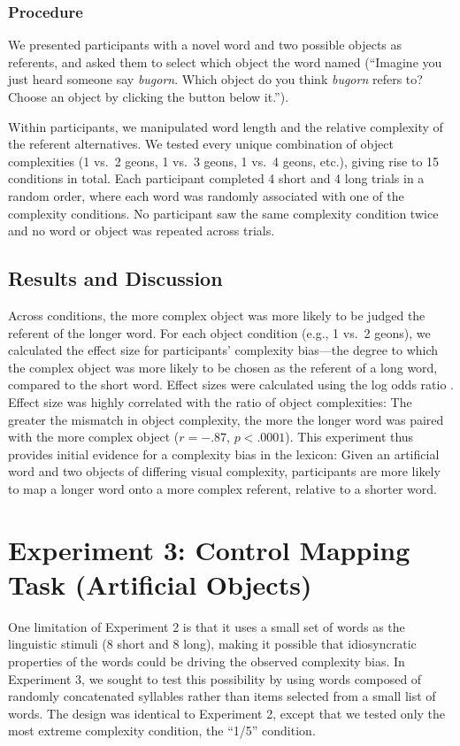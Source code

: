 \subsubsection{Procedure}

We presented participants with a novel word and two possible objects as referents, and asked them to select which object the word named (``Imagine you just heard someone say {\it bugorn}. Which object do you think {\it bugorn} refers to? Choose an object by clicking the button below it.'').

Within participants, we manipulated word length and the relative complexity of the referent alternatives. We tested every unique combination of object complexities (1 vs.\ 2 geons, 1 vs.\ 3 geons, 1 vs.\ 4 geons, etc.), giving rise to 15 conditions in total. Each participant completed 4 short and 4 long trials in a random order, where each word was randomly associated with one of the complexity conditions. No participant saw the same complexity condition twice and no word or object was repeated across trials.

\subsection{Results and Discussion}
Across conditions, the more complex object was more likely to be judged the referent of the longer word. For each object condition (e.g., 1 vs.\ 2 geons), we calculated the effect size for participants' complexity bias---the degree to which the complex object was more likely to be chosen as the referent of a long word, compared to the short word. Effect sizes were calculated using the log odds ratio \cite{sanchez2003effect}. Effect size was highly correlated with the ratio of object complexities: The greater the mismatch in object complexity, the more the longer word was paired with the more complex object ($r = -.87$, $p < .0001$). This experiment thus provides initial evidence for a complexity bias in the lexicon: Given an artificial word and two objects of differing visual complexity, participants are more likely to map a longer word onto a more complex referent, relative to a shorter word.


\section{Experiment 3: Control Mapping Task (Artificial Objects)}
One limitation of Experiment 2 is that it uses a small set of words as the linguistic stimuli (8 short and 8 long), making it possible that idiosyncratic properties of the words could be driving the observed complexity bias. In Experiment 3, we sought to test this possibility by using words composed of randomly concatenated syllables rather than items selected from a small list of words. The design was identical to Experiment 2, except that we tested only the most extreme complexity condition, the ``1/5'' condition.

